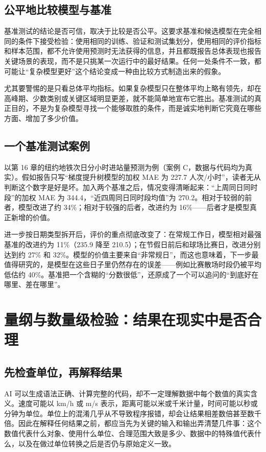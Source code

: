 \subsection{公平地比较模型与基准}

基准测试的结论是否可信，取决于比较是否公平。这要求基准和候选模型在完全相同的条件下接受检验：使用相同的训练、验证和测试集划分，使用相同的评价指标和样本范围，都不允许使用预测时无法获得的信息，并且都既报告总体表现也报告关键场景的表现，而不是只挑某一次运行中的最好结果。任何一处条件不一致，都可能让“复杂模型更好”这个结论变成一种由比较方式制造出来的假象。

尤其要警惕的是只看总体平均指标。如果复杂模型只在整体平均上略有领先，却在高峰期、少数类别或关键区域明显更差，就不能简单地宣布它胜出。基准测试的真正目的，不是为复杂模型寻找一个能够取胜的条件，而是诚实地判断它究竟在哪些方面、增加了多少价值。

\subsection{一个基准测试案例}

以第 16 章的纽约地铁次日分小时进站量预测为例（案例 C，数据与代码均为真实）。假如报告只写“梯度提升树模型的加权 MAE 为 227.7 人次/小时”，读者无从判断这个数字是好是坏。加入两个基准之后，情况变得清晰起来：“上周同日同时段”的加权 MAE 为 344.4，“近四周同日同时段均值”为 270.2。相对于较弱的前者，模型改进了约 34\%；相对于较强的后者，改进约为 16\%——后者才是模型真正新增的价值。

进一步按日期类型拆开后，评价的重点彻底改变了：在常规工作日，模型相对最强基准的改进约为 11\%（235.9 降至 210.5）；在节假日前后和球场比赛日，改进分别达到约 27\% 和 32\%。模型的价值主要来自“非常规日”，而这也意味着，下一步最值得研究的，是模型在这些日子里仍然存在的误差——例如比赛散场时段仍被平均低估约 40\%。基准把一个含糊的“分数很低”，还原成了一个可以追问的“到底好在哪里、差在哪里”。

\section{量纲与数量级检验：结果在现实中是否合理}

\subsection{先检查单位，再解释结果}

AI 可以生成语法正确、计算完整的代码，却不一定理解数据中每个数值的真实含义。速度可能以 km/h 或 m/s 表示，距离可能以米或千米计量，时间可能以秒或分钟为单位。单位上的混淆几乎从不导致程序报错，却会让结果相差数倍甚至数千倍。因此在解释任何结果之前，都应当先为关键的输入和输出弄清楚几件事：这个数值代表什么对象、使用什么单位、合理范围大致是多少、数据中的特殊值代表什么，以及在做过单位转换之后是否仍与原始定义一致。

